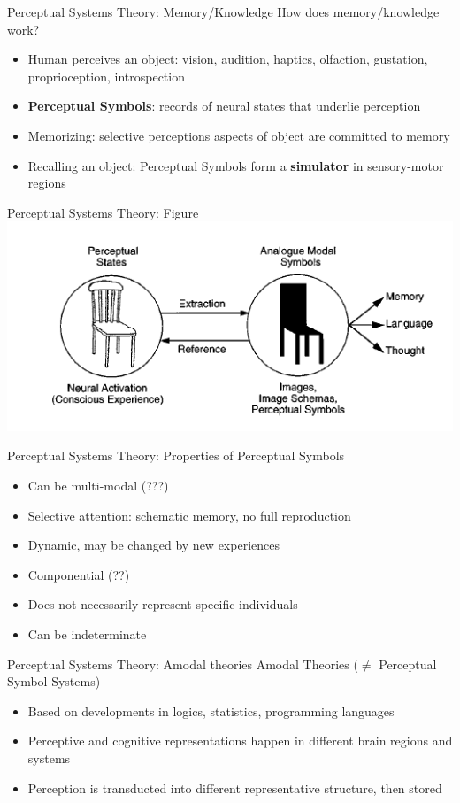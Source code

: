 \documentclass[12pt,a4paper]{beamer}
\begin{document}
\begin{frame}{Perceptual Systems Theory: Memory/Knowledge}
How does memory/knowledge work?
\begin{itemize}
\item Human perceives an object: vision, audition, haptics, olfaction, gustation, proprioception, introspection
\item \textbf{Perceptual Symbols}: records of neural states that underlie perception
\item Memorizing: selective perceptions aspects of object are committed to memory
\item Recalling an object: Perceptual Symbols form a \textbf{simulator} in sensory-motor regions
\end{itemize}
\end{frame}

\begin{frame}{Perceptual Systems Theory: Figure}
\includegraphics[scale=0.8]{barsalou_figure_1_perceptual_symbol_systems.png}
\end{frame}


\begin{frame}{Perceptual Systems Theory: Properties of Perceptual Symbols}
\begin{itemize}
\item Can be multi-modal (???)
\item Selective attention: schematic memory, no full reproduction
\item Dynamic, may be changed by new experiences
\item Componential (??)
\item Does not necessarily represent specific individuals
\item Can be indeterminate
\end{itemize}
\end{frame}


\begin{frame}{Perceptual Systems Theory: Amodal theories }
Amodal Theories ($\neq$ Perceptual Symbol Systems)
\begin{itemize}
\item Based on developments in logics, statistics, programming languages
\item Perceptive and cognitive representations happen in different brain regions and systems
\item Perception is transducted into different representative structure, then stored
\end{itemize}
\end{frame}
\end{document}
